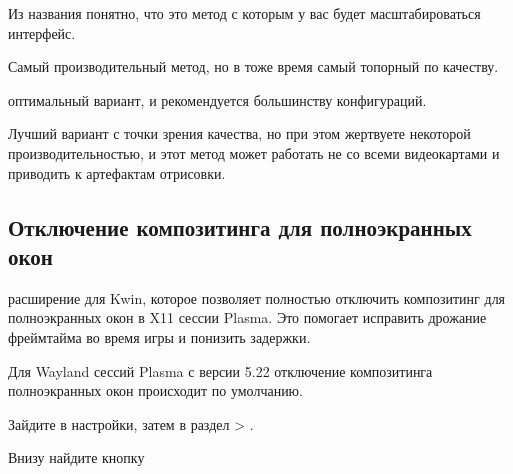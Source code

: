 \documentclass[letterpaper,10pt,russian,openany]{sphinxmanual}
\begin{document}
\sphinxAtStartPar
{}

\sphinxAtStartPar
Из названия понятно, что это метод с которым у вас будет масштабироваться интерфейс.

\sphinxAtStartPar
{} \sphinxhyphen{} Самый производительный метод, но в тоже время самый топорный по качеству.

\sphinxAtStartPar
{} \sphinxhyphen{} оптимальный вариант, и рекомендуется большинству конфигураций.

\sphinxAtStartPar
{} \sphinxhyphen{} Лучший вариант с точки зрения качества, но при этом жертвуете некоторой производительностью,
и этот метод может работать не со всеми видеокартами и приводить к артефактам отрисовки.

\ignorespaces 

\subsection{Отключение композитинга для полноэкранных окон}
\label{\detokenize{source/de-optimizations:kwin-full-screen-unredirection}}\label{\detokenize{source/de-optimizations:index-14}}\label{\detokenize{source/de-optimizations:id6}}
\sphinxAtStartPar
{} \sphinxhyphen{} расширение для Kwin, которое позволяет
полностью отключить композитинг для полноэкранных окон в X11 сессии Plasma. Это помогает
исправить дрожание фреймтайма во время игры и понизить задержки.

\sphinxAtStartPar
Для Wayland сессий Plasma с версии 5.22 отключение композитинга полноэкранных окон происходит
по умолчанию.

\sphinxAtStartPar
{}

\sphinxAtStartPar
Зайдите в настройки, затем в раздел  \sphinxhyphen{}> .

\noindent{}

\sphinxAtStartPar
Внизу найдите кнопку 

\noindent{}
\end{document}
